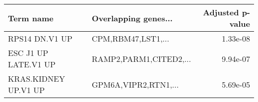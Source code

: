 \begin{tabular}{llr}
\toprule
           Term name &   Overlapping genes... &  Adjusted p-value \\
\midrule
      RPS14 DN.V1 UP &     CPM,RBM47,LST1,... &          1.33e-08 \\
ESC J1 UP LATE.V1 UP & RAMP2,PARM1,CITED2,... &          9.94e-07 \\
KRAS.KIDNEY UP.V1 UP &   GPM6A,VIPR2,RTN1,... &          5.69e-05 \\
\bottomrule
\end{tabular}
